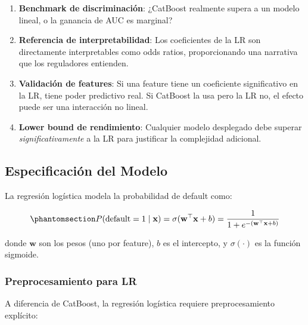 \documentclass[
  spanish,
  11pt,
  letterpaper,
]{scrbook}
\providecommand{\tightlist}{%
  \setlength{\itemsep}{0pt}\setlength{\parskip}{0pt}}
\theoremstyle{plain}
\theoremstyle{remark}
\begin{document}
\begin{enumerate}
\def\labelenumi{\arabic{enumi}.}
\tightlist
\item
  \textbf{Benchmark de discriminación}: ¿CatBoost realmente supera a un
  modelo lineal, o la ganancia de AUC es marginal?
\item
  \textbf{Referencia de interpretabilidad}: Los coeficientes de la LR
  son directamente interpretables como odds ratios, proporcionando una
  narrativa que los reguladores entienden.
\item
  \textbf{Validación de features}: Si una feature tiene un coeficiente
  significativo en la LR, tiene poder predictivo real. Si CatBoost la
  usa pero la LR no, el efecto puede ser una interacción no lineal.
\item
  \textbf{Lower bound de rendimiento}: Cualquier modelo desplegado debe
  superar \emph{significativamente} a la LR para justificar la
  complejidad adicional.
\end{enumerate}

\subsection{Especificación del
Modelo}\label{especificaciuxf3n-del-modelo}

La regresión logística modela la probabilidad de default como:

\begin{equation}\protect\phantomsection\label{eq-logistic}{
P(\text{default} = 1 \mid \mathbf{x}) = \sigma(\mathbf{w}^\top \mathbf{x} + b) = \frac{1}{1 + e^{-(\mathbf{w}^\top \mathbf{x} + b)}}
}\end{equation}

donde \(\mathbf{w}\) son los pesos (uno por feature), \(b\) es el
intercepto, y \(\sigma(\cdot)\) es la función sigmoide.

\subsubsection{Preprocesamiento para LR}\label{preprocesamiento-para-lr}

A diferencia de CatBoost, la regresión logística requiere
preprocesamiento explícito:
\end{document}
